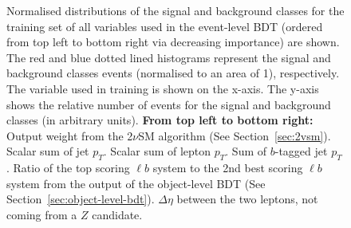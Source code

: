 \begin{figure}
    \caption{Normalised distributions of the signal and background classes for the training set of all variables used in the event-level BDT (ordered from top left to bottom right via decreasing importance) are shown. The red and blue dotted lined histograms represent the signal and background classes events (normalised to an area of 1), respectively. The variable used in training is shown on the x-axis. The y-axis shows the relative number of events for the signal and background classes (in arbitrary units). \textbf{From top left to bottom right:} Output weight from the 2$\nu$SM algorithm (See Section~\ref{sec:2vsm}). Scalar sum of jet $p_{T}$. Scalar sum of lepton $p_{T}$. Sum of $b$-tagged jet $p_{T}$. Ratio of the top scoring $\ell b$ system to the 2nd best scoring $\ell b$ system from the output of the object-level BDT (See Section~\ref{sec:object-level-bdt}). $\Delta \eta$ between the two leptons, not coming from a $Z$ candidate.}
    \label{fig:norm-event-bdt-vars}
\end{figure}

